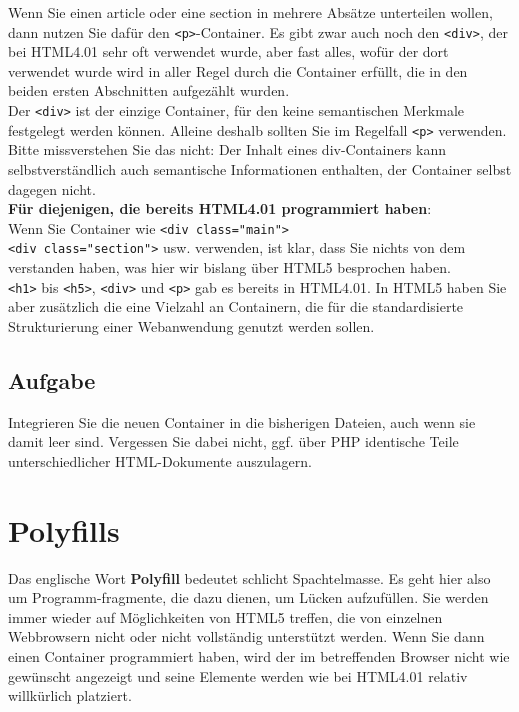 Wenn Sie einen article oder eine section in mehrere Absätze unterteilen wollen, dann nutzen Sie dafür den \verb|<p>|-Container. Es gibt zwar auch noch den \verb|<div>|, der bei HTML4.01 sehr oft verwendet wurde, aber fast alles, wofür der dort verwendet wurde wird in aller Regel durch die Container erfüllt, die in den beiden ersten Abschnitten aufgezählt wurden.\\

Der \verb|<div>| ist der einzige Container, für den keine semantischen Merkmale festgelegt werden können. Alleine deshalb sollten Sie im Regelfall \verb|<p>| verwenden. Bitte missverstehen Sie das nicht: Der Inhalt eines div-Containers kann selbstverständlich auch semantische Informationen enthalten, der Container selbst dagegen nicht.\\

\textbf{Für diejenigen, die bereits HTML4.01 programmiert haben}:\\

Wenn Sie Container wie \verb|<div class="main">|\\\verb|<div class="section">| usw. verwenden, ist klar, dass Sie nichts von dem verstanden haben, was hier wir bislang über HTML5 besprochen haben.\\

\verb|<h1>| bis \verb|<h5>|, \verb|<div>| und \verb|<p>| gab es bereits in HTML4.01. In HTML5 haben Sie aber zusätzlich die eine Vielzahl an Containern, die für die standardisierte Strukturierung einer Webanwendung genutzt werden sollen.

\subsection{Aufgabe}

Integrieren Sie die neuen Container in die bisherigen Dateien, auch wenn sie damit leer sind. Vergessen Sie dabei nicht, ggf. über PHP identische Teile unterschiedlicher HTML-Dokumente auszulagern.

\section{Polyfills}

Das englische Wort \textbf{Polyfill} bedeutet schlicht Spachtelmasse. Es geht hier also um Programm-fragmente, die dazu dienen, um Lücken aufzufüllen. Sie werden immer wieder auf Möglichkeiten von HTML5 treffen, die von einzelnen Webbrowsern nicht oder nicht vollständig unterstützt werden. Wenn Sie dann einen Container programmiert haben, wird der im betreffenden Browser nicht wie gewünscht angezeigt und seine Elemente werden wie bei HTML4.01 relativ willkürlich platziert.\\

